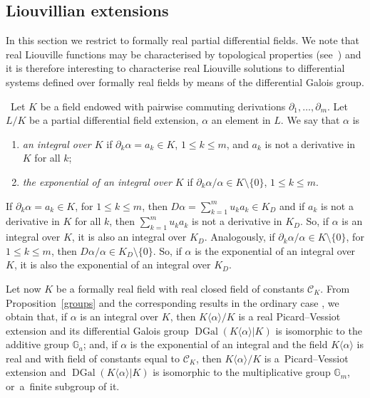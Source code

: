 \documentclass[pdftex]{sigma}%
\numberwithin{equation}{section}
\newcommand{\G}{\mathbb{G}}
\def \DGal{\operatorname{DGal}}
\begin{document}
\subsection{Liouvillian extensions}\label{sLiou}

In this section we restrict to formally real partial differential fields. We note that real Liouville functions may be characterised by topological properties (see~\cite{GK}) and it is therefore interesting to characterise real Liouville solutions to differential systems defined over formally real fields by means of the differential Galois group.


\begin{Definition}\ Let $K$ be a field endowed with pairwise commuting derivations $\partial_1,\dots,\partial_m$. Let $L/K$ be a partial differential field extension, $\alpha$ an element in $L$. We say that $\alpha$ is
\begin{enumerate}\itemsep=0pt
\item[$-$] \emph{an integral over $K$} if $\partial_k \alpha = a_k \in K$, $1 \leq k \leq m$, and $a_k$ is not a derivative in $K$ for all $k$;
\item[$-$] \emph{the exponential of an integral over $K$} if $\partial_k \alpha/\alpha \in K\setminus \{0\}$, $1 \leq k \leq m$.
\end{enumerate}
\end{Definition}

\begin{Remark}\label{intexp}
If $\partial_k \alpha = a_k \in K$, for $1 \leq k \leq m$, then $D \alpha = \sum_{k=1}^m u_k a_k \in K_D$ and if $a_k$ is not a derivative in $K$ for all $k$, then $\sum_{k=1}^m u_k a_k$ is not a derivative in $K_D$. So, if $\alpha$ is an integral over $K$, it is also an integral over $K_D$. Analogously, if $\partial_k \alpha/\alpha \in K\setminus \{0\}$, for $1 \leq k \leq m$, then $D\alpha /\alpha \in K_D\setminus \{0\}$. So, if $\alpha$ is the exponential of an integral over $K$, it is also the exponential of an integral over $K_D$.
\end{Remark}

 Let now $K$ be a formally real field with real closed field of constants $\mathcal{C}_K$. From Proposition~\ref{groups} and the corresponding results in the ordinary case \cite[Examples~7 and~8]{CH}, we obtain that, if $\alpha$ is an integral over $K$, then $K\langle \alpha \rangle/K$ is a real Picard--Vessiot extension and its differential Galois group $\DGal(K\langle \alpha
\rangle|K)$ is isomorphic to the additive group $\G_a$; and, if $\alpha$ is the
exponential of an integral and the field $K\langle \alpha \rangle$ is real and with field of constants equal to $\mathcal{C}_K$, then $K\langle \alpha \rangle/K$ is a~Picard--Vessiot extension and $\DGal(K\langle \alpha
\rangle|K)$ is isomorphic to the multiplicative group $\G_m$, or~a~finite subgroup of it.
\end{document}

